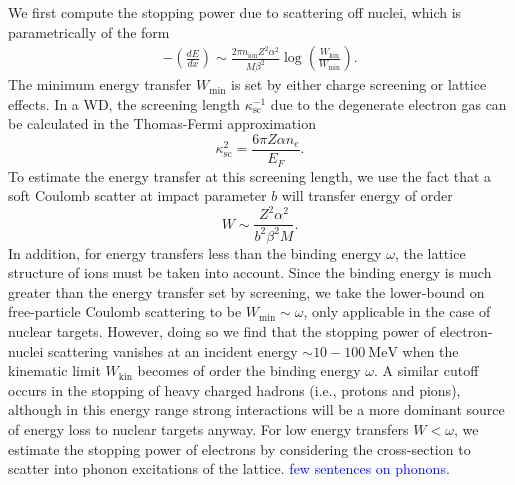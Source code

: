 \documentclass[twocolumn,showpacs,preprintnumbers,amsmath,amssymb,prd]{revtex4}
\newcommand{\MeV}{\text{MeV}}
\def\r{\right)}
\def\l{\left(}
\begin{document}
\begin{appendices}
We first compute the stopping power due to scattering off nuclei, which is parametrically of the form
\begin{align}
\label{eq:SP}
  - \l \frac{dE}{dx}\r \sim \frac{2 \pi n_\text{ion} Z^2 \alpha^2}{M \beta^2} 
    \log {\l\frac{W_\text{kin}}{W_\text{min}}\r}.
\end{align}
The minimum energy transfer $W_\text{min}$ is set by either charge screening or lattice effects.  
In a WD, the screening length $\kappa_{\text{sc}}^{-1}$ due to the degenerate electron gas can be calculated in the Thomas-Fermi approximation \cite{Teukolsky}
\begin{equation}
\label{eq:TF}
\kappa_{\text{sc}}^{2} = \frac{6 \pi Z \alpha n_e}{E_F}.
\end{equation}
To estimate the energy transfer at this screening length, we use the fact that a soft Coulomb scatter at impact parameter $b$ will transfer energy of order
\begin{equation}
\label{eq:impact}
  W \sim \frac{Z^2 \alpha^2}{b^2 \beta^2 M}.
\end{equation}
In addition, for energy transfers less than the binding energy $\omega$, the lattice structure of ions must be taken into account. 
Since the binding energy is much greater than the energy transfer set by screening, we take the lower-bound on free-particle Coulomb scattering to be $W_\text{min} \sim \omega$, only applicable in the case of nuclear targets.
However, doing so we find that the stopping power of electron-nuclei scattering vanishes at an incident energy $\sim 10 - 100 ~\MeV$ when the kinematic limit $W_\text{kin}$ becomes of order the binding energy $\omega$.
A similar cutoff occurs in the stopping of heavy charged hadrons (i.e., protons and pions), although in this energy range strong interactions will be a more dominant source of energy loss to nuclear targets anyway. 
For low energy transfers $W < \omega$, we estimate the stopping power of electrons by considering the cross-section to scatter into phonon excitations of the lattice. 
\textcolor{blue}{few sentences on phonons}. 


\end{appendices}
\end{document}
